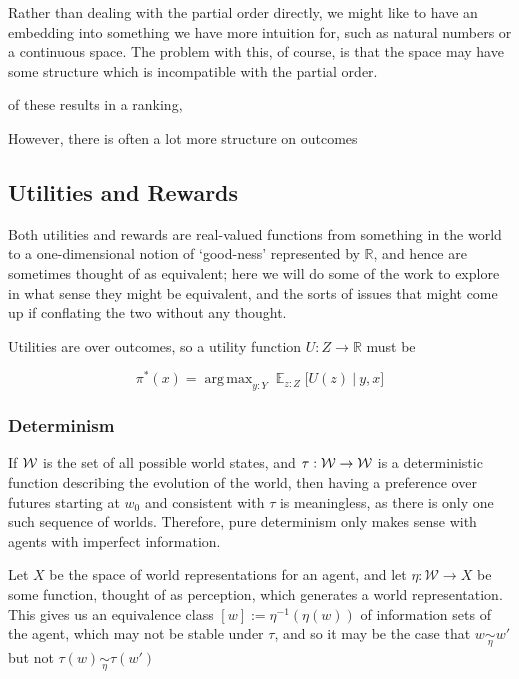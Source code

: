 \documentclass{book}
\DeclareMathOperator*{\argmax}{arg\,max}
\DeclareMathOperator*{\E}{\mathbb E}
\begin{document}
	Rather than dealing with the partial order directly, we might like to have an embedding into something we have more intuition for, such as natural numbers or a continuous space. The problem with this, of course, is that the space may have some structure which is incompatible with the partial order. 
	
	of these results in a ranking, 
	
	However, there is often a lot more structure on outcomes
	
	
	

	
	\subsection{Utilities and Rewards}
	
	Both utilities and rewards are real-valued functions from something in the world to a one-dimensional notion of `good-ness' represented by $\mathbb R$, and hence are sometimes thought of as equivalent; here we will do some of the work to explore in what sense they might be equivalent, and the sorts of issues that might come up if conflating the two without any thought.
	
	Utilities are over outcomes, so a utility function $U : Z \to \mathbb R$ must be
	
	\[ \pi^*(x) = \argmax_{y: Y} \E_{z : Z} \Big[ U(z)~\Big|~ y,x\Big] \]
	
	\subsubsection{Determinism}
	If $\cal W$ is the set of all possible world states, and $\tau: \cal W \to W$ is a deterministic function describing the evolution of the world, then having a preference over futures starting at $w_0$ and consistent with $\tau$ is meaningless, as there is only one such sequence of worlds. Therefore, pure determinism only makes sense with agents with imperfect information. 
	
	Let $X$ be the space of world representations for an agent, and let $\eta: \mathcal W \to X$ be some function, thought of as perception, which generates a world representation. This gives us an equivalence class $[w] := \eta^{-1}(\eta(w))$ of information sets of the agent, which may not be stable under $\tau$, and so it may be the case that $w \underset\eta\sim w'$ but not $\tau(w) \underset\eta\sim \tau(w')$
	
	
	
\end{document}
